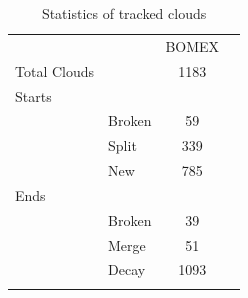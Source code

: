 \documentclass[acp]{copernicus}
\begin{document}

\begin{table}[t]
\caption{Statistics of tracked clouds}
\vskip4mm
\centering
\begin{tabular}{llcr}
\tophline
&&BOMEX\\
\middlehline
Total Clouds&&1183\\
Starts\\
&Broken&59\\
&Split&339\\
&New&785\\
Ends\\
&Broken&39\\
&Merge&51\\
&Decay&1093\\

\bottomhline
\end{tabular}
\end{table}


\end{document}
